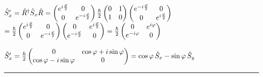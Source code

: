 \documentclass[14pt]{extarticle}
\makeatletter
\newenvironment{lefteqs}{%
    \begin{flushleft}%
    \renewcommand{\arraystretch}{1.3}%
    $\begin{array}{@{}l@{}}%
}{%
    \end{array}$%
    \end{flushleft}%
}
\makeatother
\begin{document}
\begin{lefteqs}
    \hat{S}_x' = \hat{R}^\dagger \hat{S}_x \hat{R}
    = \begin{pmatrix} e^{i\frac{\varphi}{2}} & 0 \\ 0 & e^{-i\frac{\varphi}{2}} \end{pmatrix}
    \frac{\hbar}{2} \begin{pmatrix} 0 & 1 \\ 1 & 0 \end{pmatrix}
    \begin{pmatrix} e^{-i\frac{\varphi}{2}} & 0 \\ 0 & e^{i\frac{\varphi}{2}} \end{pmatrix} \\
    = \frac{\hbar}{2} \begin{pmatrix} e^{i\frac{\varphi}{2}} & 0 \\ 0 & e^{-i\frac{\varphi}{2}} \end{pmatrix}
    \begin{pmatrix} 0 & e^{i\frac{\varphi}{2}} \\ e^{-i\frac{\varphi}{2}} & 0 \end{pmatrix}
    = \frac{\hbar}{2} \begin{pmatrix} 0 & e^{i\varphi} \\ e^{-i\varphi} & 0 \end{pmatrix}
\end{lefteqs}
\begin{lefteqs}
    \hat{S}_x' = \frac{\hbar}{2} \begin{pmatrix} 0 & \cos\varphi + i \sin\varphi \\ \cos\varphi - i \sin\varphi & 0 \end{pmatrix}
    = \cos\varphi \, \hat{S}_x - \sin\varphi \, \hat{S}_y
\end{lefteqs}

\hrule
\vspace{2em}
\end{document}

